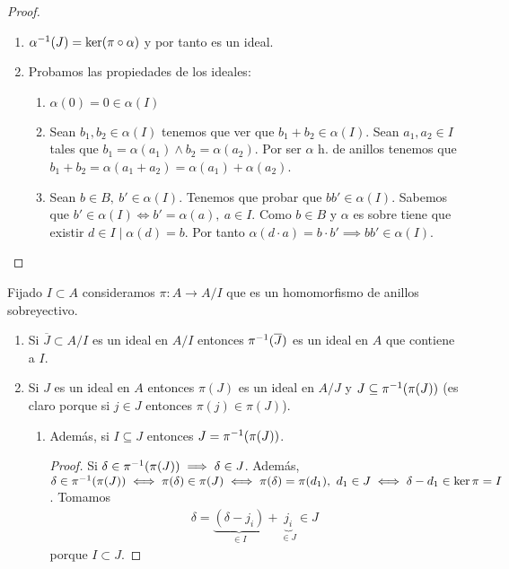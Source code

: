 \begin{proof}
	\begin{figure}[h]
		\centering
	\end{figure}
	\begin{enumerate}
		\item $\alpha^{-1}(J) = \ker(\pi \circ \alpha)$ y por tanto es un ideal.
		\item Probamos las propiedades de los ideales:
		\begin{enumerate}
			\item $\alpha(0) = 0 \in \alpha(I)$
			\item Sean $b_1, b_2 \in \alpha(I)$ tenemos que ver que $b_1 + b_2 \in \alpha(I)$. Sean $a_1, a_2 \in I$ tales que $b_1 = \alpha(a_1) \land b_2 = \alpha(a_2)$. Por ser $\alpha$ h. de anillos tenemos que $b_1 + b_2 = \alpha(a_1 + a_2) = \alpha(a_1) + \alpha(a_2)$.
			\item Sean $b \in B,\ b' \in \alpha(I)$. Tenemos que probar que $bb' \in \alpha(I)$. Sabemos que $b' \in \alpha(I) \iff b' = \alpha(a),\ a \in I$. Como $b \in B$ y $\alpha$ es sobre tiene que existir $d \in I \mid \alpha(d) = b$. Por tanto $\alpha(d\cdot a) = b \cdot b' \implies bb' \in \alpha(I)$.
		\end{enumerate}
	\end{enumerate}
\end{proof}

Fijado $I \subset A$ consideramos $\pi:A \to A/I$ que es un homomorfismo de anillos sobreyectivo.

\begin{enumerate}
	\item Si $\overline{J} \subset A /I$ es un ideal en $A / I$ entonces $\pi^{-1}(\overline{J})$ es un ideal en $A$ que contiene a $I$.
	\item Si $J$ es un ideal en $A$ entonces $\pi(J)$ es un ideal en $A/J$ y $J \subseteq \pi^{-1}(\pi(J))$ (es claro porque si $j \in J$ entonces $\pi(j) \in \pi(J)$).
	\begin{enumerate}
		\item Además, si $I \subseteq J$ entonces $J = \pi^{-1}(\pi(J))$.
		\begin{proof}
			Si $\delta \in \pi^{-1}(\pi(J)) \implies \delta \in J$. Además, $\delta \in \pi^{-1}(\pi(J)) \iff \pi(\delta) \in \pi(J) \iff \pi(\delta) = \pi(d_1),\ d_1 \in J \iff \delta - d_1 \in \ker \pi = I$. Tomamos
			\begin{align*}
				\delta = \underbrace{(\delta - j_i)}_{\in I} + \underbrace{j_i}_{\in J} \in J
			\end{align*}
			porque $I \subset J$.
		\end{proof}
	\end{enumerate}
\end{enumerate}


